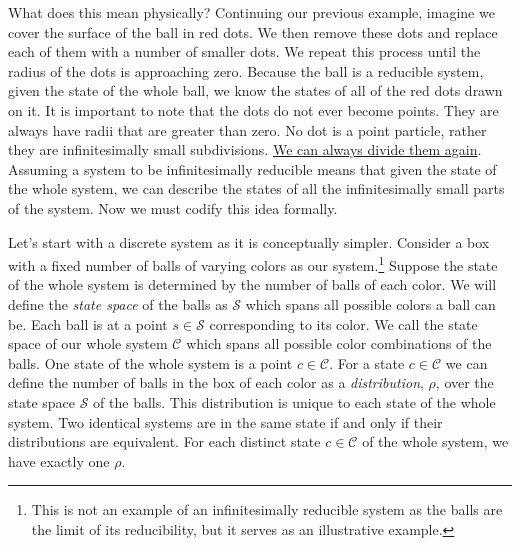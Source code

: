 \documentclass{article}
\begin{document}
	 What does this mean physically? Continuing our previous example, imagine we cover the surface of the ball in red dots. We then remove these dots and replace each of them with a number of smaller dots. We repeat this process until the radius of the dots is approaching zero. Because the ball is a reducible system, given the state of the whole ball, we know the states of all of the red dots drawn on it. It is important to note that the dots do not ever become points. They are always have radii that are greater than zero. No dot is a point particle, rather they are infinitesimally small subdivisions. \underline{We can always divide them again}. Assuming a system to be infinitesimally reducible means that given the state of the whole system, we can describe the states of all the infinitesimally small parts of the system. Now we must codify this idea formally.
	 	
	Let's start with a discrete system as it is conceptually simpler. Consider a box with a fixed number of balls of varying colors as our system.\footnote{This is not an example of an infinitesimally reducible system as the balls are the limit of its reducibility, but it serves as an illustrative example.} Suppose the state of the whole system is determined by the number of balls of each color. We will define the \textit{state space} of the balls as $\mathcal{S}$ which spans all possible colors a ball can be. Each ball is at a point $s \in \mathcal{S}$ corresponding to its color. We call the state space of our whole system $\mathcal{C}$ which spans all possible color combinations of the balls. One state of the whole system is a point $c \in \mathcal{C}$. For a state $c \in \mathcal{C}$ we can define the number of balls in the box of each color as a \textit{distribution}, $\rho$, over the state space $\mathcal{S}$ of the balls. This distribution is unique to each state of the whole system. Two identical systems are in the same state if and only if their distributions are equivalent. For each distinct state $c \in \mathcal{C}$ of the whole system, we have exactly one $\rho$. 
\end{document}
